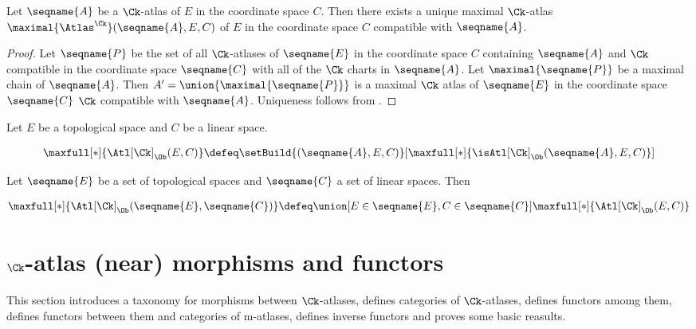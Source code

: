 \documentclass{article}
\begin{document}
\begin{theorem}
Let $\seqname{A}$ be a $\Ck$-atlas of $E$ in the coordinate space $C$.
Then there exists a unique maximal $\Ck$-atlas
$\maximal{\Atlas^\Ck}(\seqname{A}, E, C)$ of $E$ in the coordinate space $C$
compatible with $\seqname{A}$.

\begin{proof}
Let $\seqname{P}$ be the set of all $\Ck$-atlases of $\seqname{E}$ in
the coordinate space $C$ containing $\seqname{A}$ and $\Ck$ compatible
in the coordinate space $\seqname{C}$ with all of the $\Ck$ charts in
$\seqname{A}$. Let $\maximal{\seqname{P}}$ be a maximal chain of
$\seqname{A}$. Then $A'=\union{\maximal{\seqname{P}}}$ is a maximal
$\Ck$ atlas of $\seqname{E}$ in the coordinate space $\seqname{C}$
$\Ck$ compatible with $\seqname{A}$.
Uniqueness follows from .
\end{proof}
\end{theorem}

\begin{definition}
\label{def:Ck-ATLsets}

Let $E$ be a topological space and $C$ be a linear space.

\begin{multline}
\maxfull[*]{\Atl[\Ck]_\Ob(E, C)} \defeq
\setBuild
{{
   (\seqname{A}, E, C)
}}%
[
  {
    \maxfull[*]
    {
      \isAtl[\Ck]_\Ob
      (\seqname{A}, E, C)
    }
  }
]
\end{multline}

Let $\seqname{E}$ be a set of topological spaces and $\seqname{C}$ a
set of linear spaces. Then

\begin{multline}
\maxfull[*]{\Atl[\Ck]_\Ob (\seqname{E}, \seqname{C})} \defeq
  \union
    [
        {E \in \seqname{E}},
        {C \in \seqname{C}}
    ]
    {{
      \maxfull[*]{\Atl[\Ck]_\Ob(E, C)}
    }}
\end{multline}

\end{definition}

\section{$\Ck$-atlas (near) morphisms and functors}
\label{sec:ckmorph}
This section introduces a taxonomy for morphisms between $\Ck$-atlases,
defines categories of $\Ck$-atlases, defines functors amomg them,
defines functors between them and categories of m-atlases, defines
inverse functors and proves some basic reasults.
\end{document}

